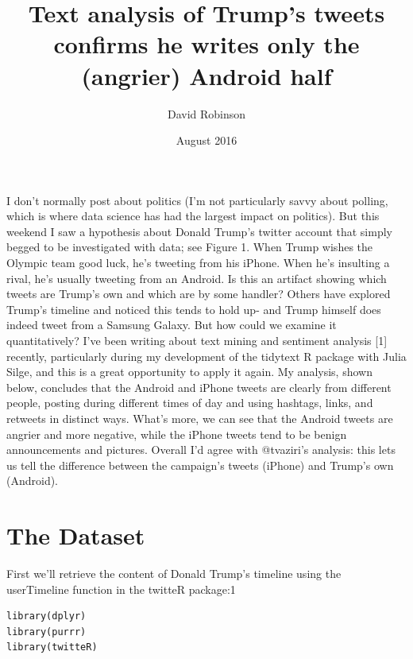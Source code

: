 \documentclass[a4paper,12pt]{article}
\title{Text analysis of Trump’s tweets confirms he writes only the
(angrier) Android half}
\author{David Robinson}
\date{August 2016}
\begin{document}
\maketitle

I don’t normally post about politics (I’m not particularly savvy about polling, which is where
data science has had the largest impact on politics). But this weekend I saw a hypothesis about
Donald Trump’s twitter account that simply begged to be investigated with data; see Figure 1.
When Trump wishes the Olympic team good luck, he’s tweeting from his iPhone. When he’s
insulting a rival, he’s usually tweeting from an Android. Is this an artifact showing which tweets
are Trump’s own and which are by some handler?
Others have explored Trump’s timeline and noticed this tends to hold up- and Trump himself
does indeed tweet from a Samsung Galaxy. But how could we examine it quantitatively? I’ve been
writing about text mining and sentiment analysis [1] recently, particularly during my development
of the tidytext R package with Julia Silge, and this is a great opportunity to apply it again.
My analysis, shown below, concludes that the Android and iPhone tweets are clearly from
different people, posting during different times of day and using hashtags, links, and retweets
in distinct ways. What’s more, we can see that the Android tweets are angrier and more
negative, while the iPhone tweets tend to be benign announcements and pictures. Overall I’d agree
with @tvaziri’s analysis: this lets us tell the difference between the campaign’s tweets (iPhone) and
Trump’s own (Android).

\section{The Dataset}
First we’ll retrieve the content of Donald Trump’s timeline using the userTimeline function in the
twitteR package:1


\begin{lstlisting}
library(dplyr)
library(purrr)
library(twitteR)
\end{lstlisting}
\end{document}
